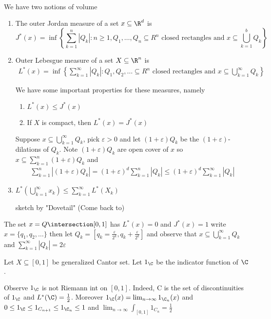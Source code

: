 We have two notions of volume
\begin{enumerate}
	\item The outer Jordan measure of a set $x \subseteq \R^d$ is
			\[
				J^* (x)
				= \inf \left\{ \sum_{k=1}^{n} |Q_k| : n \geq 1, Q_1, \ldots, Q_n \subseteq R^n
					\text{ closed rectangles and }
				x \subseteq \bigcup_{k=1}^{b} Q_k \right\}
			\]
	\item Outer Lebesgue measure of a set $X \subseteq \R^n$ is
		\begin{align*}
			L^*(x) = \inf \left\{ \sum_{k=1}^{\infty}|Q_k| : Q_1, Q_2, \ldots \subseteq R^n
				\text{ closed rectangles and } x \subseteq \bigcup_{k=1}^{\infty} Q_k \right\}
		\end{align*}

		We have some important properties for these measures, namely

		\begin{enumerate}
			\item $L^*(x) \leq J^* (x)$
			\item If  $X$ is compact, then $L^*(x) = J^*(x)$
		\end{enumerate}
		\begin{solution}
			Suppose $x \subseteq \bigcup_{k=1}^{\infty} Q_k$, pick $\varepsilon > 0$ and let  $(1 + \varepsilon)Q_k$ be the $(1 + \varepsilon)$-dilations of $Q_k$. Note $(1+ \varepsilon ) Q_k$ are open cover of  $x$ so $x \subseteq \sum_{k=1}^n (1+\varepsilon) Q_k$ and
			\begin{align*}
				\sum_{k=1}^{n} |(1 + \varepsilon) Q_k| = (1+\varepsilon)^d \sum_{k=1}^{n}|Q_k| \leq (1 + \varepsilon)^d \sum_{k=1}^{\infty} | Q_k|
			\end{align*}
		\end{solution}

	\item $L^* \left(\bigcup^{\infty}_{k = 1} x_k \right) \leq \sum_{k = 1}^{\infty} L^* (X_{k})$

		\begin{solution}
			sketch by "Dovetail" (Come back to)
		\end{solution}
\end{enumerate}

\begin{example}
	The set $x = Q \intersection [0,1]$ has  $L^*(x) = 0$ and  $J^*(x) = 1$ write  $x = \{q_1, q_2, \ldots \}$ then let $Q_k = [q_k =  \frac{\varepsilon}{2^k}, q_k + \frac{\varepsilon}{2^k}]$
	and observe that $x \subseteq \bigcup_{k = 1}^{\infty} Q_k$ and $\sum_{k=1}^{\infty} |Q_k| = 2 \varepsilon$
\end{example}

\begin{example}
	Let $X \subseteq [0,1]$ be generalized Cantor set. Let $1_{\C}$ be the indicator function of $\C$.

	Observe $1_ {\C}$ is not Riemann int on $[0,1]$. Indeed, C is the set of discontinuities of $1_{\C}$ and $L^*(\C) = \frac{1}{2}$. Moreover $1_{\C}(x) = \lim_{n\to \infty} 1_{\C_n} (x)$ and
	$0 \leq 1_{\C} \leq 1_{C_{n+1}} \leq 1_{\C_{n}} \leq 1$ and
	$\lim_{n \to \infty} \int_{[0,1]} 1_{C_{n}} = \frac{1}{2} $
\end{example}
